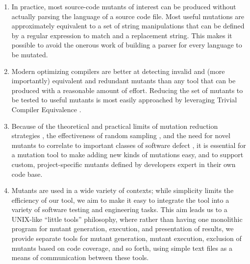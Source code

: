 \begin{enumerate}
\item In practice, most source-code mutants of interest can be
  produced without actually parsing the language of a source code
  file.  Most useful mutations are approximately equivalent to a
  set of string manipulations that can be defined by a regular
  expression to match and a replacement string.  This makes it
  possible to avoid the onerous work of building a parser for every
  language to be mutated.
\item Modern optimizing compilers are better at detecting invalid and
  (more importantly) equivalent and redundant mutants than any tool
  that can be produced with a reasonable amount of effort.  Reducing
  the set of mutants to be tested to useful mutants is most easily
  approached by leveraging Trivial Compiler Equivalence \cite{TCE}.
\item Because of the theoretical and practical limits of mutation
  reduction strategies \cite{Gopinath1,Gopinath2}, the
  effectiveness of random sampling \cite{Gopinath3}, and the need for
  novel mutants to correlate to important classes of software defect
  \cite{Just2014mutants}, it is essential for a mutation tool to make adding new
  kinds of mutations easy, and to support custom, project-specific
  mutants defined by developers expert in their own code base.
\item Mutants are used in a wide variety of contexts; while simplicity limits
  the efficiency of our tool, we aim to make it easy to integrate the tool
  into a variety of software testing and engineering tasks.
  This aim leads us to a UNIX-like ``little tools''
  philosophy, where rather than having one monolithic program for
  mutant generation, execution, and presentation of results, we
  provide separate tools for mutant generation, mutant execution,
  exclusion of mutants based on code coverage, and so forth, using
  simple text files as a means of communication between these tools.
\end{enumerate}

